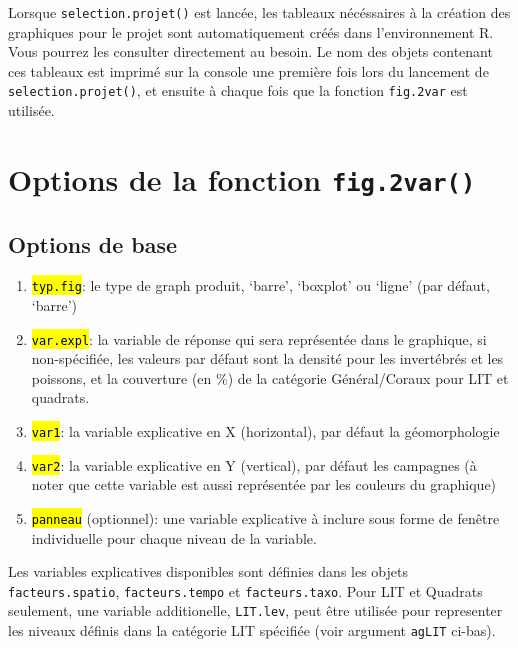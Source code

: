 \documentclass[12pt]{article}
\begin{document}
\ra Lorsque \texttt{selection.projet()} est lancée, les tableaux nécéssaires à la création des graphiques pour le projet sont automatiquement créés dans l'environnement R. Vous pourrez les consulter directement au besoin.
Le nom des objets contenant ces tableaux est imprimé sur la console une première fois lors du lancement de \texttt{selection.projet()}, et ensuite à chaque fois que la fonction \texttt{fig.2var} est utilisée.

\section{Options de la fonction \texttt{fig.2var()}}

\subsection{Options de base}
\begin{enumerate}
\item \hl{\texttt{typ.fig}}: le type de graph produit, `barre', `boxplot' ou `ligne' (par défaut, `barre')
\item \hl{\texttt{var.expl}}: la variable de réponse qui sera représentée dans le graphique, 
si non-spécifiée, les valeurs par défaut sont la densité pour les invertébrés et les poissons, et la couverture (en \%) de la catégorie Général/Coraux pour LIT et quadrats. 
\item \hl{\texttt{var1}}: la variable explicative en X (horizontal), par défaut la géomorphologie
\item \hl{\texttt{var2}}: la variable explicative en Y (vertical), par défaut les campagnes (à noter que cette variable est aussi représentée par les couleurs du graphique)
\item \hl{\texttt{panneau}} (optionnel): une variable explicative à inclure sous forme de fenêtre individuelle pour chaque niveau de la variable. 



\end{enumerate}
\ra Les variables explicatives disponibles sont définies dans les objets \\\texttt{facteurs.spatio}, \texttt{facteurs.tempo} et \texttt{facteurs.taxo}. Pour LIT et Quadrats seulement, une variable additionelle, \texttt{LIT.lev}, peut être utilisée pour representer les niveaux définis dans la catégorie LIT spécifiée (voir argument \texttt{agLIT} ci-bas).
\end{document}
